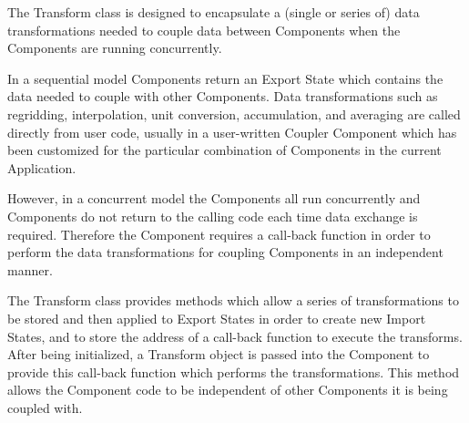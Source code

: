 %


The Transform class is designed to encapsulate a   
(single or series of)
data transformations needed to couple
data between Components when the Components are 
running concurrently.

In a sequential model Components return an Export State
which contains the data needed to couple with other
Components.  Data transformations such as regridding, interpolation,
unit conversion, accumulation, and averaging are called directly
from user code, usually in a user-written Coupler Component which
has been customized for the particular combination of Components
in the current Application.

However, in a concurrent model the Components all run concurrently 
and Components do not return to the calling code each time data 
exchange is required.  
Therefore the Component requires a call-back function in
order to perform the data transformations for coupling Components
in an independent manner.

The Transform class provides methods which allow a series 
of transformations to be stored and then 
applied to Export States in order to create new Import States, and
to store the address of a call-back function to execute the transforms.
After being initialized, a Transform object is passed into the Component
to provide this call-back function which performs the transformations.
This method allows the Component code to be independent of
other Components it is being coupled with.


